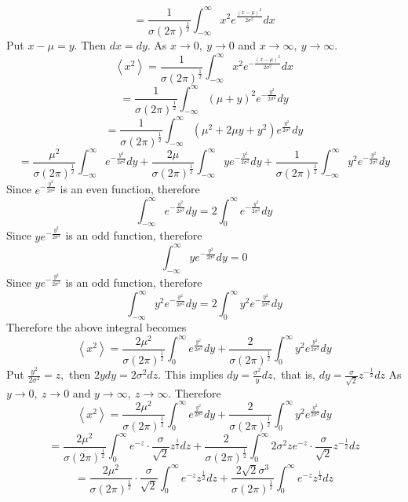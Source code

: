 $$
=\frac{1}{\sigma(2 \pi)^{\frac{1}{2}}} \int_{-\infty}^{\infty} x^{2} e^{\frac{(x-\mu)^{2}}{2 \sigma^{2}}} d x
$$
Put $x-\mu=y .$ Then $d x=d y .$ As $x \rightarrow 0, \  y \rightarrow 0$ and $x \rightarrow \infty, \  y \rightarrow \infty$.
$$
\left\langle x^{2}\right\rangle=\frac{1}{\sigma(2 \pi)^{\frac{1}{2}}} \int_{-\infty}^{\infty} x^{2} e^{-\frac{(x-\mu)^{2}}{2 \sigma^{2}}} d x
$$
$$
=\frac{1}{\sigma(2 \pi)^{\frac{1}{2}}} \int_{-\infty}^{\infty}(\mu+y)^{2} e^{-\frac{y^{2}}{2 \sigma^{2}}} d y
$$
$$
=\frac{1}{\sigma(2 \pi)^{\frac{1}{2}}} \int_{-\infty}^{\infty}\left(\mu^{2}+2 \mu y+y^{2}\right) e^{\frac{y^{2}}{2 \sigma^{2}}} d y
$$
$$
=\frac{\mu^{2}}{\sigma(2 \pi)^{\frac{1}{2}}} \int_{-\infty}^{\infty} e^{-\frac{y^{2}}{2 \sigma^{2}}} d y+\frac{2 \mu}{\sigma(2 \pi)^{\frac{1}{2}}} \int_{-\infty}^{\infty} y e^{-\frac{y^{2}}{2 \sigma^{2}}} d y+\frac{1}{\sigma(2 \pi)^{\frac{1}{2}}} \int_{-\infty}^{\infty} y^{2} e^{-\frac{y^{2}}{2 \sigma^{2}}} d y
$$
Since $e^{-\frac{y^{2}}{2 \sigma^{2}}}$ is an even function, therefore
$$
\int_{-\infty}^{\infty} e^{-\frac{y^{2}}{2 \sigma^{2}}} d y=2 \int_{0}^{\infty} e^{-\frac{y^{2}}{2 \sigma^{2}}} d y
$$
Since $y e^{-\frac{y^{2}}{2 \sigma^{2}}}$ is an odd function, therefore
$$
\int_{-\infty}^{\infty} y e^{-\frac{y^{2}}{2 \sigma^{2}}} d y=0
$$
Since $y e^{-\frac{y^{2}}{2 \sigma^{2}}}$ is an odd function, therefore
$$
\int_{-\infty}^{\infty} y^{2} e^{-\frac{y^{2}}{2 \sigma^{2}}} d y=2 \int_{0}^{\infty} y^{2} e^{-\frac{y^{2}}{2 \sigma^{2}}} d y
$$
Therefore the above integral becomes
$$
\left\langle x^{2}\right\rangle=\frac{2 \mu^{2}}{\sigma(2 \pi)^{\frac{1}{2}}} \int_{0}^{\infty} e^{\frac{y^{2}}{2 \sigma^{2}}} d y+\frac{2}{\sigma(2 \pi)^{\frac{1}{2}}} \int_{0}^{\infty} y^{2} e^{\frac{y^{2}}{2 \sigma^{2}}} d y
$$
Put $\frac{y^{2}}{2 \sigma^{2}}=z,$ then $2 y d y=2 \sigma^{2} d z$. This implies $d y=\frac{\sigma^{2}}{y} d z,$ that is, $d y=\frac{\sigma}{\sqrt{2}} z^{-\frac{1}{2}} d z$
As $y \rightarrow 0, \  z \rightarrow 0$ and $y \rightarrow \infty, \  z \rightarrow \infty$. Therefore
$$\left\langle x^{2}\right\rangle=\frac{2 \mu^{2}}{\sigma(2 \pi)^{\frac{1}{2}}} \int_{0}^{\infty} e^{\frac{y^{2}}{2 \sigma^{2}}} d y+\frac{2}{\sigma(2 \pi)^{\frac{1}{2}}} \int_{0}^{\infty} y^{2} e^{\frac{y^{2}}{2 \sigma^{2}}} d y$$
$$=\frac{2 \mu^{2}}{\sigma(2 \pi)^{\frac{1}{2}}} \int_{0}^{\infty} e^{-z} \cdot \frac{\sigma}{\sqrt{2}} z^{\frac{1}{2}} d z+\frac{2}{\sigma(2 \pi)^{\frac{1}{2}}} \int_{0}^{\infty} 2 \sigma^{2} z e^{-z} \cdot \frac{\sigma}{\sqrt{2}} z^{-\frac{1}{2}} d z$$
$$=\frac{2 \mu^{2}}{\sigma(2 \pi)^{\frac{1}{2}}} \cdot \frac{\sigma}{\sqrt{2}} \int_{0}^{\infty} e^{-z} z^{\frac{1}{2}} d z+\frac{2 \sqrt{2} \sigma^{3}}{\sigma(2 \pi)^{\frac{1}{2}}} \int_{0}^{\infty} e^{-z} z^{\frac{1}{2}} d z$$
